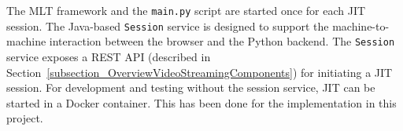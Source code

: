 \documentclass[../MasterThesis.tex]{subfiles}
\begin{document}
The MLT framework and the \texttt{main.py} script are started once for each JIT session.
The Java-based \texttt{Session} service is designed to support the machine-to-machine interaction between the browser and the Python backend. 
The \texttt{Session} service exposes a REST API (described in Section~\ref{subsection_OverviewVideoStreamingComponents}) for initiating a JIT session. 
%
%
%
%
%
%
%
%
%
For development and testing without the session service, JIT can be started in a Docker container. This has been done for the implementation in this project.


\end{document}
